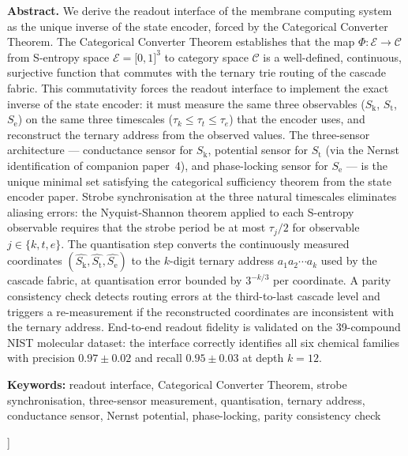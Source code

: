 \documentclass[11pt,twocolumn,a4paper]{article}
\theoremstyle{definition}
\theoremstyle{remark}
\newcommand{\Sk}{S_{\mathrm{k}}}
\newcommand{\St}{S_{\mathrm{t}}}
\newcommand{\Se}{S_{\mathrm{e}}}
\begin{document}
\begin{@twocolumnfalse}
\begin{center}
\begin{minipage}{0.92\textwidth}
\textbf{Abstract.}
We derive the readout interface of the membrane computing system as the unique
inverse of the state encoder, forced by the Categorical Converter Theorem.
The Categorical Converter Theorem establishes that the map
$\Phi\colon \mathcal{E} \to \mathcal{C}$ from S-entropy space $\mathcal{E} = \lbrack 0,1\rbrack^3$
to category space $\mathcal{C}$ is a well-defined, continuous, surjective
function that commutes with the ternary trie routing of the cascade fabric.
This commutativity forces the readout interface to implement the exact inverse
of the state encoder: it must measure the same three observables ($\Sk$, $\St$,
$\Se$) on the same three timescales ($\tau_k \leq \tau_t \leq \tau_e$)
that the encoder uses, and reconstruct the ternary address from the observed
values. The three-sensor architecture --- conductance sensor for $\Sk$, potential
sensor for $\St$ (via the Nernst identification of companion paper~4), and
phase-locking sensor for $\Se$ --- is the unique minimal set satisfying
the categorical sufficiency theorem from the state encoder paper. Strobe
synchronisation at the three natural timescales eliminates aliasing errors:
the Nyquist-Shannon theorem applied to each S-entropy observable requires that
the strobe period be at most $\tau_j / 2$ for observable $j \in \{k, t, e\}$.
The quantisation step converts the continuously measured coordinates
$(\hat{\Sk}, \hat{\St}, \hat{\Se})$ to the $k$-digit ternary address
$a_1 a_2 \cdots a_k$ used by the cascade fabric, at quantisation error bounded
by $3^{-k/3}$ per coordinate. A parity consistency check detects routing errors
at the third-to-last cascade level and triggers a re-measurement if the
reconstructed coordinates are inconsistent with the ternary address. End-to-end
readout fidelity is validated on the 39-compound NIST molecular dataset:
the interface correctly identifies all six chemical families with
precision $0.97 \pm 0.02$ and recall $0.95 \pm 0.03$ at depth $k = 12$.
\end{minipage}

\vspace{8pt}
\noindent\textbf{Keywords:}
readout interface, Categorical Converter Theorem, strobe synchronisation, three-sensor
measurement, quantisation, ternary address, conductance sensor, Nernst potential,
phase-locking, parity consistency check

\vspace{18pt}
\end{center}
\end{@twocolumnfalse}
]
\end{document}
